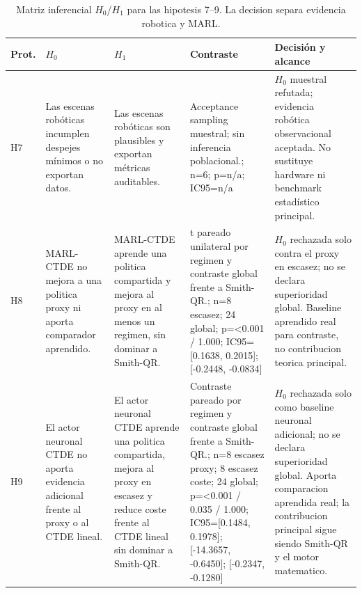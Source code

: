 \begin{table}[H]
\centering
\caption{Matriz inferencial $H_0$/$H_1$ para las hipotesis 7--9. La decision separa evidencia robotica y MARL.}
\label{tab:hypothesis-decision-base-c}
\scriptsize
\begin{tabularx}{\textwidth}{@{}>{\raggedright\arraybackslash}p{}>{\raggedright\arraybackslash}p{}>{\raggedright\arraybackslash}p{}>{\raggedright\arraybackslash}p{}>{\raggedright\arraybackslash}X@{}}
\toprule
Prot. & $H_0$ & $H_1$ & Contraste & Decisión y alcance \\
\midrule
H7 & Las escenas robóticas incumplen despejes mínimos o no exportan datos. & Las escenas robóticas son plausibles y exportan métricas auditables. & Acceptance sampling muestral; sin inferencia poblacional.; n=6; p=n/a; IC95=n/a & $H_0$ muestral refutada; evidencia robótica observacional aceptada. No sustituye hardware ni benchmark estadístico principal. \\
H8 & MARL-CTDE no mejora a una politica proxy ni aporta comparador aprendido. & MARL-CTDE aprende una politica compartida y mejora al proxy en al menos un regimen, sin dominar a Smith-QR. & t pareado unilateral por regimen y contraste global frente a Smith-QR.; n=8 escasez; 24 global; p=\textless{}0.001 / 1.000; IC95=[0.1638, 0.2015]; [-0.2448, -0.0834] & $H_0$ rechazada solo contra el proxy en escasez; no se declara superioridad global. Baseline aprendido real para contraste, no contribucion teorica principal. \\
H9 & El actor neuronal CTDE no aporta evidencia adicional frente al proxy o al CTDE lineal. & El actor neuronal CTDE aprende una politica compartida, mejora al proxy en escasez y reduce coste frente al CTDE lineal sin dominar a Smith-QR. & Contraste pareado por regimen y contraste global frente a Smith-QR.; n=8 escasez proxy; 8 escasez coste; 24 global; p=\textless{}0.001 / 0.035 / 1.000; IC95=[0.1484, 0.1978]; [-14.3657, -0.6450]; [-0.2347, -0.1280] & $H_0$ rechazada solo como baseline neuronal adicional; no se declara superioridad global. Aporta comparacion aprendida real; la contribucion principal sigue siendo Smith-QR y el motor matematico. \\
\bottomrule
\end{tabularx}
\end{table}

